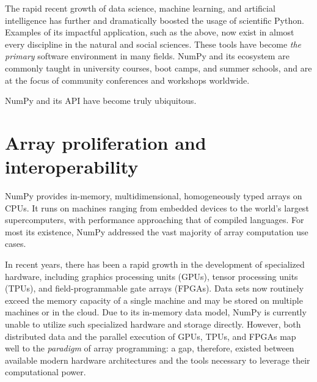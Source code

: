 The rapid recent growth of data science, machine learning, and
artificial intelligence has further and dramatically boosted the usage of
scientific Python.  Examples of its impactful application, such as the
above, now exist in almost every discipline in the natural and social
sciences.  These tools have become \emph{the
primary} software environment in many fields.  NumPy and its ecosystem are commonly
taught in university courses, boot camps, and summer schools, and are
at the focus of community conferences and workshops worldwide.

NumPy and its API have become truly ubiquitous.

\section*{Array proliferation and interoperability}

NumPy provides in-memory, multidimensional, homogeneously typed
arrays on CPUs.  It runs on machines
ranging from embedded devices to the world's largest supercomputers,
with performance approaching that of compiled languages.  For
most its existence, NumPy addressed the vast majority of
array computation use cases.




In recent years, there has been a rapid growth in the development of
specialized hardware, including graphics processing
units (GPUs), tensor processing units (TPUs), and field-programmable
gate arrays (FPGAs).  Data sets now routinely exceed the memory capacity of a single machine and may be stored on multiple machines or in
the cloud.  Due to its in-memory data model, NumPy is currently unable to
utilize such specialized hardware and storage directly.  However, both
distributed data and the parallel execution of GPUs, TPUs, and FPGAs map well
to the \emph{paradigm} of array programming: a gap, therefore, existed between
available modern hardware architectures and the tools necessary to
leverage their computational power.

